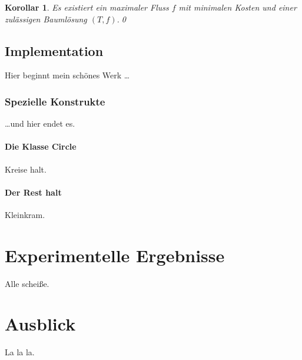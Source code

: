 \documentclass[a4paper,twoside,ngerman]{report}
\theoremstyle{plain}
\newtheorem{kor}[thm]{Korollar}
\theoremstyle{definition}
\begin{document}
\begin{kor}\label{minCostFlow}Es existiert ein maximaler Fluss $f$ mit minimalen Kosten und einer zulässigen Baumlösung $(T,f)$.\qed\end{kor}




\section{Implementation} \label{prog}
Hier beginnt mein schönes Werk \ldots

\subsection{Spezielle Konstrukte}
\ldots und hier endet es.

\subsubsection{Die Klasse Circle}
Kreise halt.\cite{NSAbook}

\subsubsection{Der Rest halt}
Kleinkram.

\newpage
\chapter{Experimentelle Ergebnisse}
Alle scheiße.

\newpage
\chapter{Ausblick}
La la la.

{}

\end{document}

